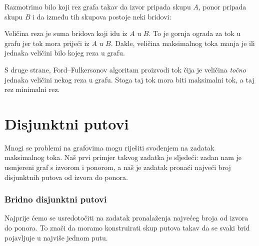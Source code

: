 Razmotrimo bilo koji rez grafa
takav da izvor pripada skupu $A$,
ponor pripada skupu $B$
i da između tih skupova postoje neki bridovi:

\begin{center}
\end{center}

Veličina reza je suma bridova
koji idu iz $A$ u $B$.
To je gornja ograda za tok
u grafu jer tok mora prijeći
iz $A$ u $B$.
Dakle, veličina maksimalnog toka manja je ili jednaka
veličini bilo kojeg reza u grafu.

S druge strane, Ford–Fulkersonov algoritam
proizvodi tok čija je veličina \emph{točno} jednaka
veličini nekog reza u grafu.
Stoga taj tok mora biti maksimalni tok,
a taj rez minimalni rez.

\section{Disjunktni putovi}

Mnogi se problemi na grafovima mogu riješiti svođenjem
na zadatak maksimalnog toka.
Naš prvi primjer takvog zadatka je
sljedeći: zadan nam je usmjereni graf
s izvorom i ponorom,
a naš je zadatak pronaći najveći broj
disjunktnih putova od izvora do ponora.

\subsubsection{Bridno disjunktni putovi}

Najprije ćemo se usredotočiti na zadatak
pronalaženja najvećeg broja
 od izvora do ponora.
To znači da moramo konstruirati skup putova
takav da se svaki brid pojavljuje u najviše jednom putu.

